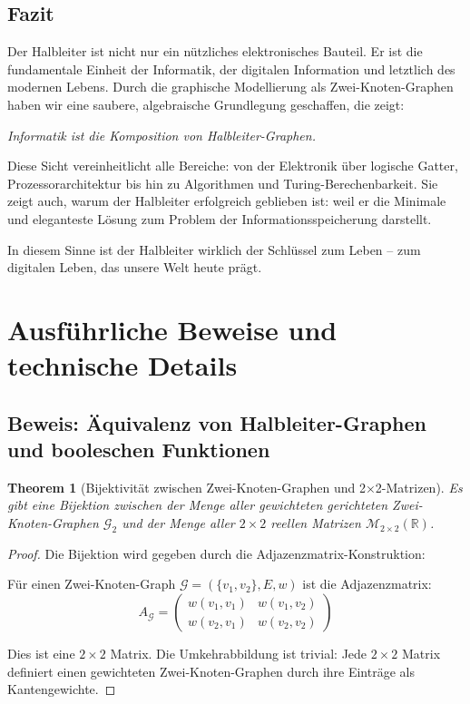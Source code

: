 \documentclass[12pt, a4paper]{article}
\newtheorem{theorem}{Theorem}[section]
\theoremstyle{definition}
\theoremstyle{remark}
\newcommand{\R}{\mathbb{R}}
\newcommand{\Graph}{\mathcal{G}}
\begin{document}
\subsection{Fazit}
\label{subsec:fazit}

Der Halbleiter ist nicht nur ein nützliches elektronisches Bauteil. Er ist die fundamentale Einheit der Informatik, der digitalen Information und letztlich des modernen Lebens. Durch die graphische Modellierung als Zwei-Knoten-Graphen haben wir eine saubere, algebraische Grundlegung geschaffen, die zeigt:

\begin{center}
\textit{Informatik ist die Komposition von Halbleiter-Graphen.}
\end{center}

Diese Sicht vereinheitlicht alle Bereiche: von der Elektronik über logische Gatter, Prozessorarchitektur bis hin zu Algorithmen und Turing-Berechenbarkeit. Sie zeigt auch, warum der Halbleiter erfolgreich geblieben ist: weil er die Minimale und eleganteste Lösung zum Problem der Informationsspeicherung darstellt.

In diesem Sinne ist der Halbleiter wirklich der Schlüssel zum Leben -- zum digitalen Leben, das unsere Welt heute prägt.

\appendix

\section{Ausführliche Beweise und technische Details}
\label{sec:anhang_beweise}

\subsection{Beweis: Äquivalenz von Halbleiter-Graphen und booleschen Funktionen}
\label{subsec:anhang_boolesche_aequivalenz}

\begin{theorem}[Bijektivität zwischen Zwei-Knoten-Graphen und 2×2-Matrizen]
\label{thm:anhang_2x2_bijektiv}
Es gibt eine Bijektion zwischen der Menge aller gewichteten gerichteten Zwei-Knoten-Graphen $\mathcal{G}_2$ und der Menge aller $2 \times 2$ reellen Matrizen $\mathcal{M}_{2 \times 2}(\R)$.
\end{theorem}

\begin{proof}
Die Bijektion wird gegeben durch die Adjazenzmatrix-Konstruktion:

Für einen Zwei-Knoten-Graph $\Graph = (\{v_1, v_2\}, E, w)$ ist die Adjazenzmatrix:
\[
  A_{\Graph} = \begin{pmatrix} w(v_1, v_1) & w(v_1, v_2) \\ w(v_2, v_1) & w(v_2, v_2) \end{pmatrix}
\]

Dies ist eine $2 \times 2$ Matrix. Die Umkehrabbildung ist trivial: Jede $2 \times 2$ Matrix definiert einen gewichteten Zwei-Knoten-Graphen durch ihre Einträge als Kantengewichte.
\end{proof}
\end{document}
